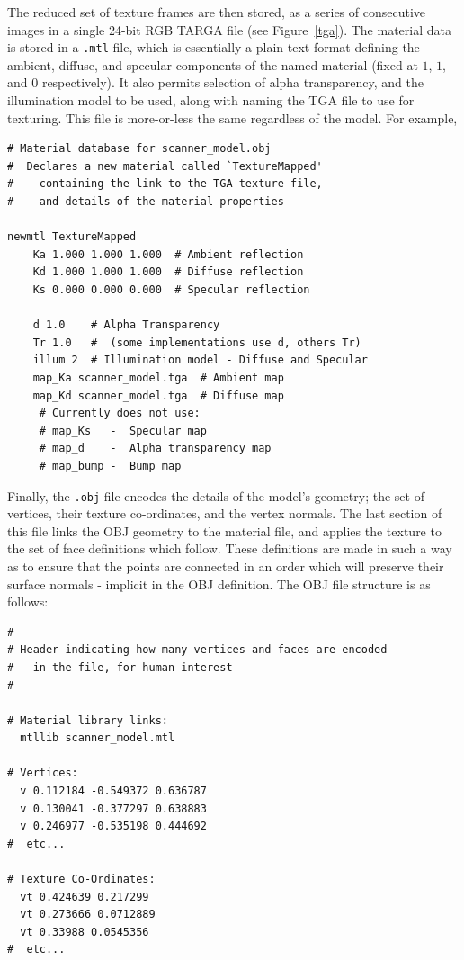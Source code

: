 \documentclass[a4paper,10pt]{article}
\begin{document}
\begin{itemize}
{The reduced set of texture frames are then stored, as a series of consecutive images in a single 24-bit RGB TARGA\cite{targa} file (see Figure~\ref{tga}). The material data is stored in a \texttt{.mtl} file, which is essentially a plain text format defining the ambient, diffuse, and specular components of the named material (fixed at $1$, $1$, and $0$ respectively). It also permits selection of alpha transparency, and the illumination model to be used, along with naming the TGA file to use for texturing. This file is more-or-less the same regardless of the model. For example,

\begin{verbatim}
# Material database for scanner_model.obj
#  Declares a new material called `TextureMapped'
#    containing the link to the TGA texture file,
#    and details of the material properties

newmtl TextureMapped
    Ka 1.000 1.000 1.000  # Ambient reflection
    Kd 1.000 1.000 1.000  # Diffuse reflection
    Ks 0.000 0.000 0.000  # Specular reflection
 
    d 1.0    # Alpha Transparency
    Tr 1.0   #  (some implementations use d, others Tr)
    illum 2  # Illumination model - Diffuse and Specular
    map_Ka scanner_model.tga  # Ambient map
    map_Kd scanner_model.tga  # Diffuse map
     # Currently does not use:
     # map_Ks   -  Specular map
     # map_d    -  Alpha transparency map
     # map_bump -  Bump map
\end{verbatim}

Finally, the \texttt{.obj} file encodes the details of the model's geometry; the set of vertices, their texture co-ordinates, and the vertex normals. The last section of this file links the OBJ geometry to the material file, and applies the texture to the set of face definitions which follow. These definitions are made in such a way as to ensure that the points are connected in an order which will preserve their surface normals - implicit in the OBJ definition. The OBJ file structure is as follows:

\begin{verbatim}
#
# Header indicating how many vertices and faces are encoded
#   in the file, for human interest
#

# Material library links:
  mtllib scanner_model.mtl

# Vertices:
  v 0.112184 -0.549372 0.636787
  v 0.130041 -0.377297 0.638883
  v 0.246977 -0.535198 0.444692
#  etc...

# Texture Co-Ordinates:
  vt 0.424639 0.217299
  vt 0.273666 0.0712889
  vt 0.33988 0.0545356
#  etc...


\end{verbatim}}
\end{itemize}
\end{document}
